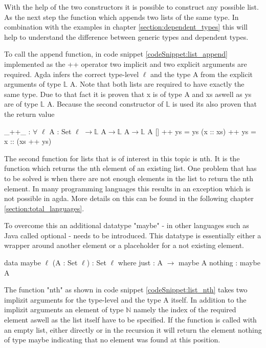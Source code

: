 With the help of the two constructors it is possible to construct any possible list. As the next step the function which appends two lists of the same type. In combination with the examples in chapter \ref{section:dependent_types} this will help to understand the difference between generic types and dependent types.

To call the append function, in code snippet \ref{codeSnippet:list_append} implemented as the ++ operator two implicit and two explicit arguments are required. 
Agda infers the correct type-level $\ell$ and the type A from the explicit arguments of type $\mathbb{L}$ A. Note that both lists are required to have exactly the same type.
Due to that fact it is proven that x is of type A and xs aswell as ys are of type $\mathbb{L}$ A. Because the second constructor of $\mathbb{L}$ is used its also proven that the return value 
\begin{codesnippet}[mathescape=true, caption={Definition of the list append function in Agda}, label={codeSnippet:list_append}]
_++_ : $\forall$ {$\ell$} {A : Set $\ell$} $\rightarrow \mathbb{L}$ A$\rightarrow \mathbb{L}$ A$\rightarrow \mathbb{L}$ A
  []        ++ ys = ys
  (x :: xs) ++ ys = x :: (xs ++ ys)
\end{codesnippet}

The second function for lists that is of interest in this topic is nth. It is the function which returns the nth element of an existing list.
One problem that has to be solved is when there are not enough elements in the list to return the nth element. 
In many programming languages this results in an exception which is not possible in agda.
More details on this can be found in the following chapter \ref{section:total_languages}.

To overcome this an additional datatype "maybe" - in other languages such as Java called optional - needs to be introduced.
This datatype is essentially either a wrapper around another element or a placeholder for a not existing element.
\begin{codesnippet}[mathescape=true, caption={Definition of the maybe datatype in Agda}, label={codeSnippet:maybe_datatype}]
data maybe {$\ell$} (A : Set $\ell$) : Set $\ell$ where
  just : A $\rightarrow$ maybe A
  nothing : maybe A
\end{codesnippet}

The function "nth" as shown in code snippet \ref{codeSnippet:list_nth} takes two implizit arguments for the type-level and the type A itself.
In addition to the implizit arguments an element of type $\mathbb{N}$ namely the index of the required element aswell as the list itself have to be specified.
If the function is called with an empty list, either directly or in the recursion it will return the element nothing of type maybe indicating that no element was found at this position.

